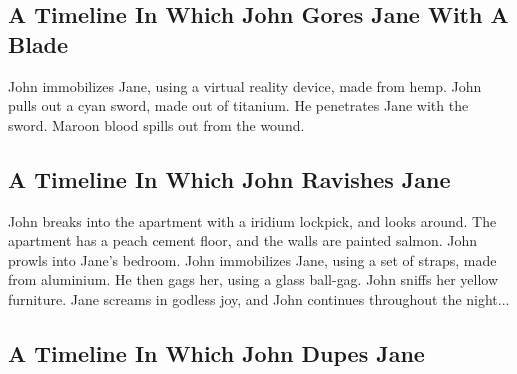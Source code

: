 \documentclass{article}
\begin{document}
\subsection{A Timeline In Which John Gores Jane With A Blade}


John immobilizes Jane, using a virtual reality device, made from hemp.
John pulls out a cyan sword, made out of titanium.
He penetrates Jane with the sword.
Maroon blood spills out from the wound.
\subsection{A Timeline In Which John Ravishes Jane}


John breaks into the apartment with a iridium lockpick, and looks around.
The apartment has a peach cement floor, and the walls are painted salmon.
John prowls into Jane's bedroom.
John immobilizes Jane, using a set of straps, made from aluminium.
He then gags her, using a glass ball{-}gag.
John sniffs her yellow furniture.
Jane screams in godless joy, and John continues throughout the night...
\subsection{A Timeline In Which John Dupes Jane}
\end{document}
